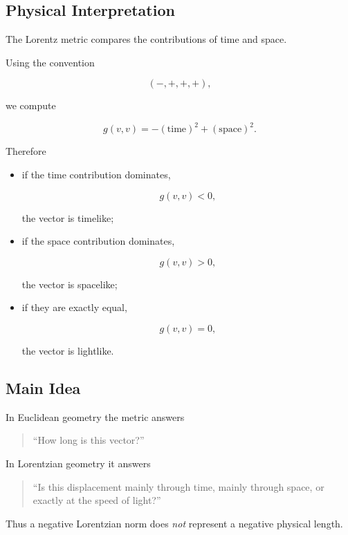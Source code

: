 \documentclass[12pt,a4paper]{article}
\theoremstyle{notespace}
\begin{document}

\subsection{Physical Interpretation}

The Lorentz metric compares the contributions of time and space.

Using the convention

\[
(-,+,+,+),
\]

we compute

\[
g(v,v)
=
-(\text{time})^2
+
(\text{space})^2.
\]

Therefore

\begin{itemize}
	\item if the time contribution dominates,
	
	\[
	g(v,v)<0,
	\]
	
	the vector is timelike;
	
	\item if the space contribution dominates,
	
	\[
	g(v,v)>0,
	\]
	
	the vector is spacelike;
	
	\item if they are exactly equal,
	
	\[
	g(v,v)=0,
	\]
	
	the vector is lightlike.
\end{itemize}


\subsection{Main Idea}

In Euclidean geometry the metric answers

\begin{quote}
	``How long is this vector?''
\end{quote}

In Lorentzian geometry it answers

\begin{quote}
	``Is this displacement mainly through time,
	mainly through space,
	or exactly at the speed of light?''
\end{quote}

Thus a negative Lorentzian norm does \emph{not}
represent a negative physical length.
\end{document}
